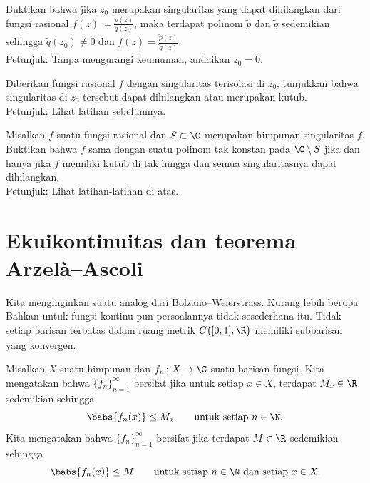 \begin{exercise}
Buktikan bahwa jika $z_0$ merupakan singularitas yang dapat dihilangkan dari fungsi
rasional $f(z) \coloneqq \frac{p(z)}{q(z)}$, maka terdapat
polinom $\widetilde{p}$ dan $\widetilde{q}$ sedemikian sehingga
$\widetilde{q}(z_0) \neq 0$ dan $f(z) =
\frac{\widetilde{p}(z)}{\widetilde{q}(z)}$.
\\
Petunjuk: Tanpa mengurangi keumuman, andaikan $z_0 = 0$.
\end{exercise}

\begin{exercise}
Diberikan fungsi rasional $f$ dengan singularitas terisolasi di $z_0$,
tunjukkan bahwa singularitas di $z_0$ tersebut dapat dihilangkan atau merupakan kutub.
\\
Petunjuk: Lihat latihan sebelumnya.
\end{exercise}

\begin{exercise}
Misalkan $f$ suatu fungsi rasional dan $S \subset \C$ merupakan
himpunan singularitas $f$.
Buktikan bahwa $f$ sama dengan suatu polinom tak konstan pada $\C \setminus S$
jika dan hanya jika
$f$ memiliki kutub di tak hingga dan semua singularitasnya dapat dihilangkan.
\\
Petunjuk: Lihat latihan-latihan di atas.
\end{exercise}




\sectionnewpage
\section{Ekuikontinuitas dan teorema Arzel\`a--Ascoli}
\label{sec:arzelaascoli}


Kita menginginkan suatu analog dari Bolzano--Weierstrass.  Kurang lebih berupa
Bahkan untuk fungsi kontinu pun persoalannya
tidak sesederhana itu.
Tidak setiap barisan terbatas dalam ruang metrik $C\bigl([0,1],\R\bigr)$ memiliki
subbarisan yang konvergen.

\begin{defn}
Misalkan $X$ suatu himpunan dan
$f_n \colon X \to \C$ suatu barisan fungsi.  Kita mengatakan bahwa
$\{ f_n \}_{n=1}^\infty$
bersifat \emph{} jika untuk setiap $x \in X$, terdapat $M_x \in \R$
sedemikian sehingga
\begin{equation*}
\babs{f_n(x)} \leq M_x \qquad \text{untuk setiap } n \in \N .
\end{equation*}
Kita mengatakan bahwa
$\{ f_n \}_{n=1}^\infty$
bersifat \emph{} jika terdapat $M \in \R$
sedemikian sehingga
\begin{equation*}
\babs{f_n(x)} \leq M \qquad \text{untuk setiap } n \in \N \text{ dan setiap } x \in X.
\end{equation*}
\end{defn}


